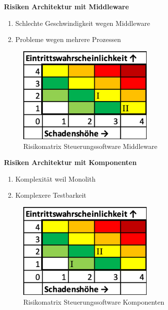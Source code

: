 \documentclass[../../main.tex]{subfiles}
\begin{document}
\textbf{Risiken Architektur mit Middleware}
    \begin{enumerate}[I]
        \item Schlechte Geschwindigkeit wegen Middleware
        \item Probleme wegen mehrere Prozessen
    \end{enumerate}

    \begin{figure}[H]
        \centering
        \includegraphics[width=0.6\textwidth]{../../images/Steuerungssoftware/Risiko_Steuerungssoftware_Middleware.png}
        \caption {Risikomatrix Steuerungssoftware Middleware}
    \end{figure}

\textbf{Risiken Architektur mit Komponenten}
    \begin{enumerate}[I]
        \item Komplexität weil Monolith
        \item Komplexere Testbarkeit
    \end{enumerate}

    \begin{figure}[H]
        \centering
        \includegraphics[width=0.6\textwidth]{../../images/Steuerungssoftware/Risiko_Steuerungssoftware_Komponenten.png}
        \caption {Risikomatrix Steuerungssoftware Komponenten}
    \end{figure}
\end{document}
